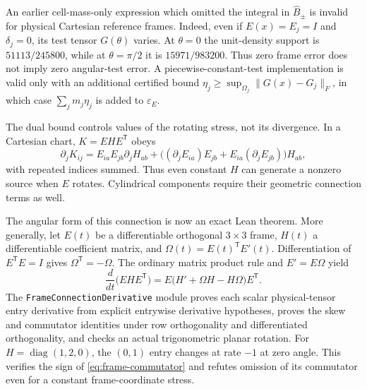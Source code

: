 \documentclass[11pt,a4paper]{article}
\theoremstyle{plain}
\theoremstyle{definition}
\newcommand{\norm}[1]{\lVert #1\rVert}
\begin{document}
An earlier cell-mass-only expression which omitted the integral in
$\widehat B_\pm$ is invalid for physical Cartesian reference frames.
Indeed, even if $E(x)=E_j=I$ and $\delta_j=0$, its test tensor
$G(\theta)$ varies. At $\theta=0$ the unit-density support is
$51113/245800$, while at $\theta=\pi/2$ it is $15971/983200$.
Thus zero frame error does not imply zero angular-test error. A
piecewise-constant-test implementation is valid only with an
additional certified bound
$\eta_j\ge\sup_{\Omega_j}\norm{G(x)-G_j}_F$,
in which case $\sum_jm_j\eta_j$ is added to $\varepsilon_E$.

The dual bound controls values of the rotating stress, not its
divergence. In a Cartesian chart, $K=EHE^{\mathsf T}$ obeys
\begin{equation}\label{eq:rotating-frame-connection}
 \partial_jK_{ij}
 =E_{ia}E_{jb}\partial_jH_{ab}
 +\bigl((\partial_jE_{ia})E_{jb}
       +E_{ia}(\partial_jE_{jb})\bigr)H_{ab},
\end{equation}
with repeated indices summed. Thus even constant $H$ can
generate a nonzero source when $E$ rotates. Cylindrical
components require their geometric connection terms as well.

The angular form of this connection is now an exact Lean theorem.
More generally, let $E(t)$ be a differentiable orthogonal
$3\times3$ frame, $H(t)$ a differentiable coefficient matrix, and
$\Omega(t)=E(t)^{\mathsf T}E'(t)$. Differentiation of
$E^{\mathsf T}E=I$ gives $\Omega^{\mathsf T}=-\Omega$. The ordinary
matrix product rule and $E'=E\Omega$ yield
\begin{equation}\label{eq:frame-commutator}
 \frac{d}{dt}\bigl(EHE^{\mathsf T}\bigr)
 =E\bigl(H'+\Omega H-H\Omega\bigr)E^{\mathsf T}.
\end{equation}
The \texttt{FrameConnectionDerivative} module proves each
scalar physical-tensor entry derivative from explicit entrywise
derivative hypotheses, proves the skew and commutator identities
under row orthogonality and differentiated orthogonality, and checks
an actual trigonometric planar rotation. For
$H=\operatorname{diag}(1,2,0)$, the $(0,1)$ entry changes at
rate $-1$ at zero angle. This verifies the sign of
\eqref{eq:frame-commutator} and refutes omission of its commutator
even for a constant frame-coordinate stress.
\end{document}
